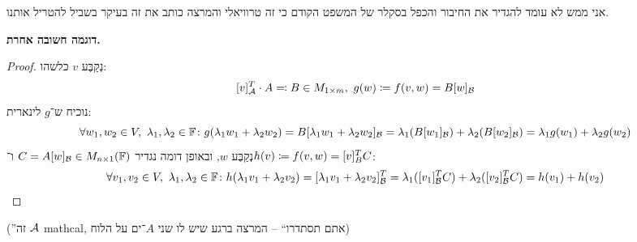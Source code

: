 \documentclass[name=רשימות אלגברה לינארית 2א]{../../../tex/classes/megasumPreamble}
\begin{document}
	
	
	
	אני ממש לא עומד להגדיר את החיבור והכפל בסקלר של המשפט הקודם כי זה טרוויאלי והמרצה כותב את זה בעיקר בשביל להטריל אותנו. 
	
	\textbf{דוגמה חשובה אחרת. }
	\begin{proof}
		נְקַבֶּע $v$ כלשהו:
		\[ [v]_{\mathcal{A}}^T \cdot A \eqqcolon B \in M_{1 \times m}, \ g(w) \coloneqq f(v, w) = B[w]_{\mathcal{B}} \]
		נוכיח ש־$g$ לינארית: 
		\[ \forall w_1, w_2 \in V, \ \lambda_1, \lambda_2 \in \mathbb{F} \colon  g(\lambda_1w_1 + \lambda_2w_2) = B[\lambda_1w_1 + \lambda_2w_2]_{\mathcal{B}} = \lambda_1(B[w_1]_{\mathcal{B}}) + \lambda_2(B[w_2]_{\mathcal{B}}) = \lambda_1g(w_1) + \lambda_2 g(w_2) \]
		נְקַבֶּע $w$, ובאופן דומה נגדיר $C = A[w]_{\mathcal{B}} \in M_{n \times 1}(\mathbb{F})$ ו־$h(v) \coloneqq f(v, w) = [v]_B^{T}C$: 
		\[  \forall v_1, v_2 \in V, \ \lambda_1, \lambda_2 \in \mathbb{F} \colon h(\lambda_1v_1 + \lambda_2v_2) = [\lambda_1v_1 + \lambda_2v_2]_{\mathcal{B}}^T = \lambda_1([v_1]_{\mathcal{B}}^TC) + \lambda_2([v_2]_{\mathcal{B}}^TC) = h(v_1) + h(v_2) \]
	\end{proof}
	(''זה $\mathcal{A}$ mathcal, אתם תסתדרו`` – המרצה ברגע שיש לו שני $A$־ים על הלוח)
	
	
\end{document}
